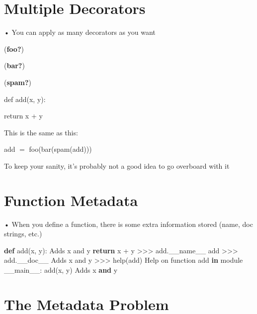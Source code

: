 \documentclass[
  letterpaper,
  DIV=11,
  numbers=noendperiod]{scrreprt}
\newenvironment{Shaded}{\begin{snugshade}}{\end{snugshade}}
\newcommand{\BuiltInTok}[1]{\textcolor[rgb]{0.00,0.23,0.31}{#1}}
\newcommand{\CommentTok}[1]{\textcolor[rgb]{0.37,0.37,0.37}{#1}}
\newcommand{\ControlFlowTok}[1]{\textcolor[rgb]{0.00,0.23,0.31}{\textbf{#1}}}
\newcommand{\KeywordTok}[1]{\textcolor[rgb]{0.00,0.23,0.31}{\textbf{#1}}}
\newcommand{\NormalTok}[1]{\textcolor[rgb]{0.00,0.23,0.31}{#1}}
\newcommand{\OperatorTok}[1]{\textcolor[rgb]{0.37,0.37,0.37}{#1}}
\newcommand{\VariableTok}[1]{\textcolor[rgb]{0.07,0.07,0.07}{#1}}
\begin{document}

\chapter{Multiple Decorators}\label{multiple-decorators}

• You can apply as many decorators as you want

(\textbf{foo?})

(\textbf{bar?})

(\textbf{spam?})

def add(x, y):

return x + y

This is the same as this:

add \(=\) foo(bar(spam(add)))

To keep your sanity, it's probably not a good idea to go overboard with
it


\chapter{Function Metadata}\label{function-metadata}

• When you define a function, there is some extra information stored
(name, doc strings, etc.)

\begin{Shaded}
\begin{Highlighting}[]
\KeywordTok{def}\NormalTok{ add(x, y):}
    \CommentTok{\textquotesingle{}Adds x and y\textquotesingle{}}
    \ControlFlowTok{return}\NormalTok{ x }\OperatorTok{+}\NormalTok{ y}
\OperatorTok{\textgreater{}\textgreater{}\textgreater{}}\NormalTok{ add.}\VariableTok{\_\_name\_\_}
\CommentTok{\textquotesingle{}add\textquotesingle{}}
\OperatorTok{\textgreater{}\textgreater{}\textgreater{}}\NormalTok{ add.\_\_doc\_\_}
\CommentTok{\textquotesingle{}Adds x and y\textquotesingle{}}
\OperatorTok{\textgreater{}\textgreater{}\textgreater{}} \BuiltInTok{help}\NormalTok{(add)}
\NormalTok{Help on function add }\KeywordTok{in}\NormalTok{ module \_\_main\_\_:}
\NormalTok{add(x, y)}
\NormalTok{    Adds x }\KeywordTok{and}\NormalTok{ y }
\end{Highlighting}
\end{Shaded}


\chapter{The Metadata Problem}\label{the-metadata-problem}
\end{document}
